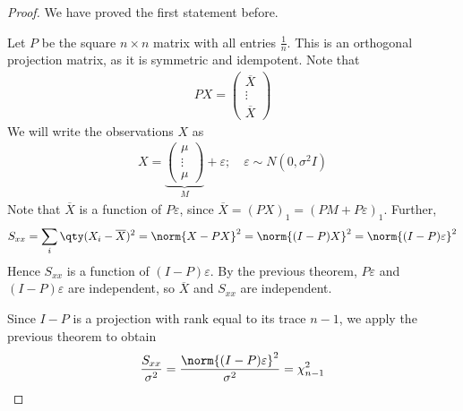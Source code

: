 \begin{proof}
	We have proved the first statement before.

	Let $P$ be the square $n \times n$ matrix with all entries $\frac{1}{n}$.
	This is an orthogonal projection matrix, as it is symmetric and idempotent.
	Note that
	\begin{align*}
		PX = \begin{pmatrix}
			\overline X \\
			\vdots      \\
			\overline X
		\end{pmatrix}
	\end{align*}
	We will write the observations $X$ as
	\begin{align*}
		X = \underbrace{\begin{pmatrix}
				\mu    \\
				\vdots \\
				\mu
			\end{pmatrix}}_{M} + \varepsilon;\quad \varepsilon \sim N(0,\sigma^2 I)
	\end{align*}
	Note that $\overline X$ is a function of $P \varepsilon$, since $\overline X = (PX)_1 = (PM + P\varepsilon)_1$.
	Further,
	\begin{align*}
		S_{xx} = \sum_i \qty(X_i - \overline X)^2 = \norm{X - PX}^2 = \norm{(I-P)X}^2 = \norm{(I-P)\varepsilon}^2
	\end{align*}
	Hence $S_{xx}$ is a function of $(I-P)\varepsilon$.
	By the previous theorem, $P\varepsilon$ and $(I-P)\varepsilon$ are independent, so $\overline X$ and $S_{xx}$ are independent.

	Since $I-P$ is a projection with rank equal to its trace $n-1$, we apply the previous theorem to obtain
	\begin{align*}
		\frac{S_{xx}}{\sigma^2} = \frac{\norm{(I-P)\varepsilon}^2}{\sigma^2} = \chi^2_{n-1}
	\end{align*}
\end{proof}

